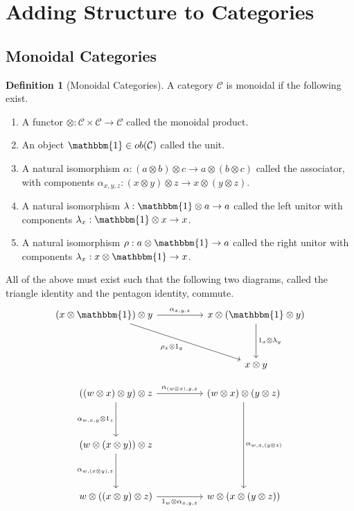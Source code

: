 \documentclass{article}
\theoremstyle{definition}
\newtheorem{definition}{Definition}
\begin{document}
\section*{Adding Structure to Categories}
\subsection*{Monoidal Categories}
\begin{definition}[Monoidal Categories]
    A category $\mathcal{C}$ is monoidal if the following exist.
    \begin{enumerate}
        \item A functor $\otimes:\mathcal{C}\times\mathcal{C}\rightarrow\mathcal{C}$ called the monoidal product.
        \item An object $\mathbbm{1}\in ob(\mathcal{C})$ called the unit.
        \item A natural isomorphism $\alpha : (a\otimes b)\otimes c\rightarrow a\otimes (b\otimes c)$ called the associator, with components $\alpha_{x,y,z}: (x\otimes y)\otimes z\rightarrow x\otimes (y\otimes z)$.
        \item A natural isomorphism $\lambda : \mathbbm{1}\otimes a\rightarrow a$ called the left unitor with components $\lambda_x : \mathbbm{1}\otimes x\rightarrow x$.
        \item A natural isomorphism $\rho : a\otimes \mathbbm{1}\rightarrow a$ called the right unitor with components $\lambda_x : x\otimes \mathbbm{1}\rightarrow x$.
    \end{enumerate}
    All of the above must exist such that the following two diagrams, called the triangle identity and the pentagon identity, commute.
    \[\begin{tikzcd}
            {(x\otimes\mathbbm{1})\otimes y} && {x\otimes(\mathbbm{1}\otimes y)} \\
            \\
            && {x\otimes y}
            \arrow["{{\rho_x\otimes 1_y}}"', from=1-1, to=3-3]
            \arrow["{{1_x\otimes\lambda_y}}", from=1-3, to=3-3]
            \arrow["{{\alpha_{x,y,z}}}", from=1-1, to=1-3]
        \end{tikzcd}\]

    \[\begin{tikzcd}
            {((w\otimes x)\otimes y)\otimes z} && {(w\otimes x)\otimes(y\otimes z)} \\
            \\
            {(w\otimes (x\otimes y))\otimes z} \\
            \\
            {w\otimes ((x\otimes y)\otimes z)} && {w\otimes (x\otimes (y\otimes z))}
            \arrow["{{\alpha_{w,x,(y\otimes z)}}}", from=1-3, to=5-3]
            \arrow["{{\alpha_{(w\otimes x),y,z}}}", from=1-1, to=1-3]
            \arrow["{{\alpha_{w,x,y}\otimes 1_z}}"', from=1-1, to=3-1]
            \arrow["{{\alpha_{w,(x\otimes y),z}}}"', from=3-1, to=5-1]
            \arrow["{{1_w\otimes \alpha_{x,y,z}}}"', from=5-1, to=5-3]
        \end{tikzcd}\]
\end{definition}



\nocite{*}

\pagebreak



\end{document}
